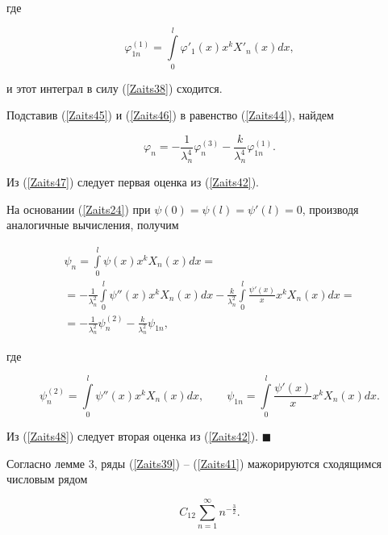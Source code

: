 где

$$\varphi_{1n}^{(1)}=\int\limits_0^l\varphi'_1(x)x^kX'_n(x)dx,$$

и этот интеграл в силу (\ref{Zaits38}) сходится.



Подставив (\ref{Zaits45}) и (\ref{Zaits46}) в равенство (\ref{Zaits44}), найдем

\begin{equation}

\label{Zaits47}

\varphi_n=-\frac{1}{\lambda_n^4}\varphi_n^{(3)}-\frac{k}{\lambda_n^4}\varphi_{1n}^{(1)}.

\end{equation}

Из (\ref{Zaits47}) следует первая оценка из (\ref{Zaits42}).



На основании (\ref{Zaits24}) при $\psi(0)=\psi(l)=\psi'(l)=0$, производя аналогичные вычисления, получим

\begin{multline}

\label{Zaits48}

\psi_n=\int\limits_0^l\psi(x)x^kX_n(x)dx=\\

=-\frac{1}{\lambda_n^2}\int\limits_0^l\psi''(x)x^kX_n(x)dx-\frac{k}{\lambda_n^2}\int\limits_0^l\frac{\psi'(x)}{x}x^kX_n(x)dx=\\

=-\frac{1}{\lambda_n^2}\psi_n^{(2)}-\frac{k}{\lambda_n^2}\psi_{1n},

\end{multline}

где

$$

\psi_n^{(2)}=\int\limits_0^l\psi''(x)x^kX_n(x)dx,\qquad \psi_{1n}=\int\limits_0^l\frac{\psi'(x)}{x}x^kX_n(x)dx.

$$

Из (\ref{Zaits48}) следует вторая оценка из (\ref{Zaits42}). $\blacksquare$



Согласно лемме 3, ряды (\ref{Zaits39}) -- (\ref{Zaits41}) мажорируются сходящимся числовым рядом

\begin{equation}

\label{Zaits49}

C_{12}\sum\limits_{n=1}^\infty n^{-\frac32}.

\end{equation}

